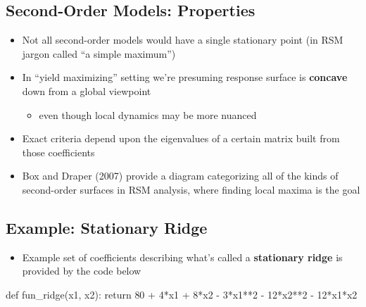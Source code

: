 \documentclass[
  letterpaper,
  DIV=11,
  numbers=noendperiod]{scrreprt}
\newenvironment{Shaded}{\begin{snugshade}}{\end{snugshade}}
\newcommand{\ControlFlowTok}[1]{\textcolor[rgb]{0.00,0.23,0.31}{#1}}
\newcommand{\DecValTok}[1]{\textcolor[rgb]{0.68,0.00,0.00}{#1}}
\newcommand{\KeywordTok}[1]{\textcolor[rgb]{0.00,0.23,0.31}{#1}}
\newcommand{\NormalTok}[1]{\textcolor[rgb]{0.00,0.23,0.31}{#1}}
\newcommand{\OperatorTok}[1]{\textcolor[rgb]{0.37,0.37,0.37}{#1}}
\providecommand{\tightlist}{%
  \setlength{\itemsep}{0pt}\setlength{\parskip}{0pt}}\usepackage{longtable,booktabs,array}
\begin{document}
\hypertarget{second-order-models-properties}{%
\subsection{Second-Order Models:
Properties}\label{second-order-models-properties}}

\begin{itemize}
\tightlist
\item
  Not all second-order models would have a single stationary point (in
  RSM jargon called ``a simple maximum'')
\item
  In ``yield maximizing'' setting we're presuming response surface is
  \textbf{concave} down from a global viewpoint

  \begin{itemize}
  \tightlist
  \item
    even though local dynamics may be more nuanced
  \end{itemize}
\item
  Exact criteria depend upon the eigenvalues of a certain matrix built
  from those coefficients
\item
  Box and Draper (2007) provide a diagram categorizing all of the kinds
  of second-order surfaces in RSM analysis, where finding local maxima
  is the goal
\end{itemize}

\hypertarget{example-stationary-ridge}{%
\subsection{Example: Stationary Ridge}\label{example-stationary-ridge}}

\begin{itemize}
\tightlist
\item
  Example set of coefficients describing what's called a
  \textbf{stationary ridge} is provided by the code below
\end{itemize}

\begin{Shaded}
\begin{Highlighting}[]
\KeywordTok{def}\NormalTok{ fun\_ridge(x1, x2):}
    \ControlFlowTok{return} \DecValTok{80} \OperatorTok{+} \DecValTok{4}\OperatorTok{*}\NormalTok{x1 }\OperatorTok{+} \DecValTok{8}\OperatorTok{*}\NormalTok{x2 }\OperatorTok{{-}} \DecValTok{3}\OperatorTok{*}\NormalTok{x1}\OperatorTok{**}\DecValTok{2} \OperatorTok{{-}} \DecValTok{12}\OperatorTok{*}\NormalTok{x2}\OperatorTok{**}\DecValTok{2} \OperatorTok{{-}} \DecValTok{12}\OperatorTok{*}\NormalTok{x1}\OperatorTok{*}\NormalTok{x2}
\end{Highlighting}
\end{Shaded}
\end{document}
